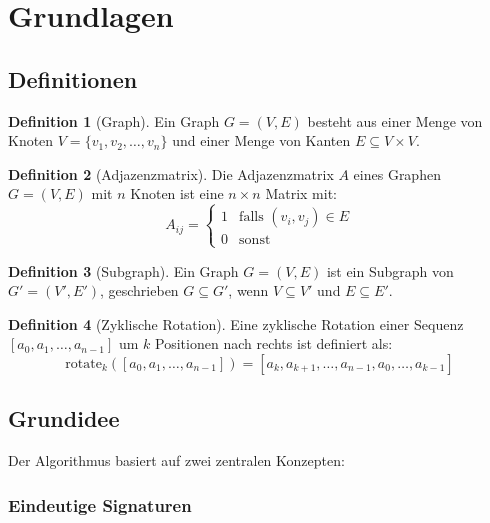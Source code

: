 ﻿\documentclass[a4paper,12pt]{article}
\theoremstyle{definition}
\newtheorem{definition}{Definition}[section]
\begin{document}
\section{Grundlagen}

\subsection{Definitionen}

\begin{definition}[Graph]
	Ein Graph $G = (V, E)$ besteht aus einer Menge von Knoten
	$V = \{v_1, v_2, \ldots, v_n\}$ und einer Menge von Kanten $E \subseteq V \times V$.
\end{definition}

\begin{definition}[Adjazenzmatrix]
	Die Adjazenzmatrix $A$ eines Graphen $G = (V, E)$ mit $n$ Knoten ist
	eine $n \times n$ Matrix mit:
	\[
	A_{ij} = \begin{cases}
		1 & \text{falls } (v_i, v_j) \in E \\
		0 & \text{sonst}
	\end{cases}
	\]
\end{definition}

\begin{definition}[Subgraph]
	Ein Graph $G = (V, E)$ ist ein Subgraph von $G' = (V', E')$,
	geschrieben $G \subseteq G'$, wenn $V \subseteq V'$ und $E \subseteq E'$.
\end{definition}

\begin{definition}[Zyklische Rotation]
	Eine zyklische Rotation einer Sequenz $[a_0, a_1, \ldots, a_{n-1}]$
	um $k$ Positionen nach rechts ist definiert als:
	\[
	\text{rotate}_k([a_0, a_1, \ldots, a_{n-1}]) =
	[a_k, a_{k+1}, \ldots, a_{n-1}, a_0, \ldots, a_{k-1}]
	\]
\end{definition}

\subsection{Grundidee}

Der Algorithmus basiert auf zwei zentralen Konzepten:

\subsubsection{Eindeutige Signaturen}
\end{document}

